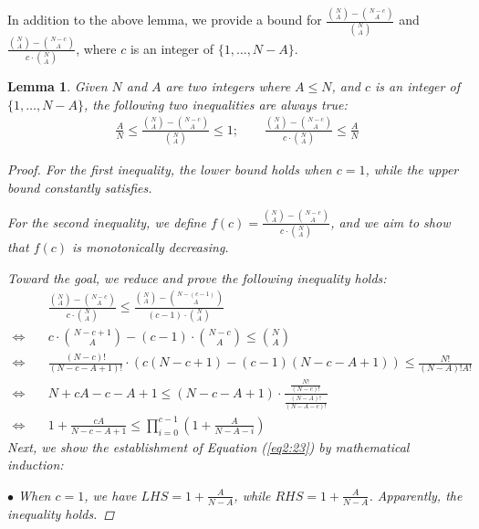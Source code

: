 \documentclass{article}
\theoremstyle{plain}
\newtheorem{lemma}[theorem]{Lemma}
\theoremstyle{definition}
\theoremstyle{remark}
\renewcommand{\eqref}[1]{Equation (\ref{#1})}
\begin{document}
In addition to the above lemma, we provide a bound for $\frac{\binom{N}{A} - \binom{N - c}{A}}{\binom{N}{A}}$ and $\frac{\binom{N}{A} - \binom{N - c}{A}}{c \cdot \binom{N}{A}}$, where $c$ is an integer of $\{1, \dots, N-A\}$. 

\begin{lemma} \label{lemma2: 2}
Given $N$ and $A$ are two integers where $A \leq N$, and $c$ is an integer of $\{1, \dots, N-A\}$, the following two inequalities are always true:
\begin{align}
    \frac{A}{N} \leq  \frac{\binom{N}{A} - \binom{N - c}{A}}{\binom{N}{A}} \leq 1; \qquad \frac{\binom{N}{A} - \binom{N - c}{A}}{c \cdot \binom{N}{A}} \leq \frac{A}{N} \label{eq2:18}
\end{align}
\begin{proof}
For the first inequality, the lower bound holds when $c=1$, while the upper bound constantly satisfies. 

For the second inequality, we define $f(c) = \frac{\binom{N}{A} - \binom{N - c}{A}}{c \cdot \binom{N}{A}}$, and we aim to show that $f(c)$ is \textit{monotonically decreasing}.

Toward the goal, we reduce and prove the following inequality holds:
\begin{align}
    & \frac{\binom{N}{A} - \binom{N - c}{A}}{c \cdot \binom{N}{A}} \leq  \frac{\binom{N}{A} - \binom{N - (c
    -1)}{A}}{(c-1) \cdot \binom{N}{A}} \\
    \iff \quad & c \cdot \binom{N - c
    + 1}{A} - (c-1) \cdot \binom{N - c}{A} \leq \binom{N}{A}\\
    \iff \quad & \frac{(N-c)!}{(N-c-A+1)!} \cdot \left(c(N-c+1) - (c-1)(N-c-A+1)\right) \leq \frac{N!}{(N-A)!A!} \\
    \iff \quad & N + cA - c - A + 1 \leq (N - c - A + 1) \cdot \frac{\frac{N!}{(N-c)!}}{\frac{(N-A)!}{(N-A-c)!}} \\
    \iff \quad & 1 + \frac{cA}{N - c - A + 1} \leq \prod_{i=0}^{c-1} \left(1 + \frac{A}{N - A - i}\right) \label{eq2:23}
\end{align}
Next, we show the establishment of \eqref{eq2:23} by mathematical induction:

$\bullet$ When $c = 1$, we have $LHS = 1 + \frac{A}{N - A}$, while $RHS = 1 + \frac{A}{N - A}$. Apparently, the inequality holds. 


\end{proof}
\end{lemma}
\end{document}
